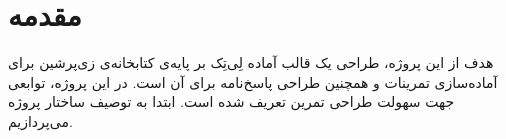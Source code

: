 \newpage
\FirstPageStyle

{
	\section{مقدمه}
	{
هدف از این پروژه، طراحی یک قالب آماده لِی‌تِک بر پایه‌ی کتابخانه‌ی زی‌پرشین برای آماده‌سازی تمرینات و همچنین طراحی پاسخ‌نامه برای آن است. در این پروژه، توابعی جهت سهولت طراحی تمرین تعریف شده است. ابتدا به توصیف ساختار پروژه می‌پردازیم.
	}

}
